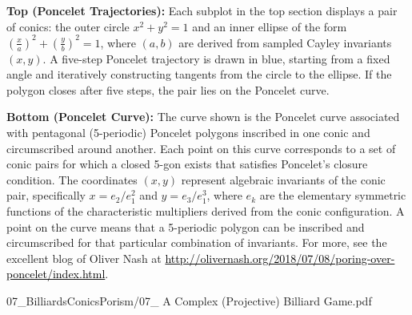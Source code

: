 \begin{SideNotePage}{
  \textbf{Top (Poncelet Trajectories):} Each subplot in the top section displays a pair of conics: the outer circle $x^2 + y^2 = 1$ and an inner ellipse of the form $\left(\frac{x}{a}\right)^2 + \left(\frac{y}{b}\right)^2 = 1$, where $(a, b)$ are derived from sampled Cayley invariants $(x, y)$. A five-step Poncelet trajectory is drawn in blue, starting from a fixed angle and iteratively constructing tangents from the circle to the ellipse. If the polygon closes after five steps, the pair lies on the Poncelet curve. \par

  \textbf{Bottom (Poncelet Curve):} The curve shown is the Poncelet curve associated with pentagonal (5-periodic) Poncelet polygons inscribed in one conic and circumscribed around another. Each point on this curve corresponds to a set of conic pairs for which a closed 5-gon exists that satisfies Poncelet's closure condition. The coordinates $(x, y)$ represent algebraic invariants of the conic pair, specifically $x = e_2 / e_1^2$ and $y = e_3 / e_1^3$, where $e_k$ are the elementary symmetric functions of the characteristic multipliers derived from the conic configuration. A point on the curve means that a 5-periodic polygon can be inscribed and circumscribed for that particular combination of invariants. For more, see the excellent blog of Oliver Nash at \href{http://olivernash.org/2018/07/08/poring-over-poncelet/index.html}{\textcolor{black}{http://olivernash.org/2018/07/08/poring-over-poncelet/index.html}}. \par
}{07_BilliardsConicsPorism/07_ A Complex (Projective) Billiard Game.pdf}
\end{SideNotePage}
